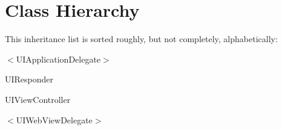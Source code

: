 \section{Class Hierarchy}
This inheritance list is sorted roughly, but not completely, alphabetically\-:\begin{DoxyCompactList}
\item {}
\item $<$U\-I\-Application\-Delegate$>$\begin{DoxyCompactList}
\item {}
\end{DoxyCompactList}
\item U\-I\-Responder\begin{DoxyCompactList}
\item {}
\end{DoxyCompactList}
\item U\-I\-View\-Controller\begin{DoxyCompactList}
\item {}
\end{DoxyCompactList}
\item $<$U\-I\-Web\-View\-Delegate$>$\begin{DoxyCompactList}
\item {}
\end{DoxyCompactList}
\end{DoxyCompactList}
